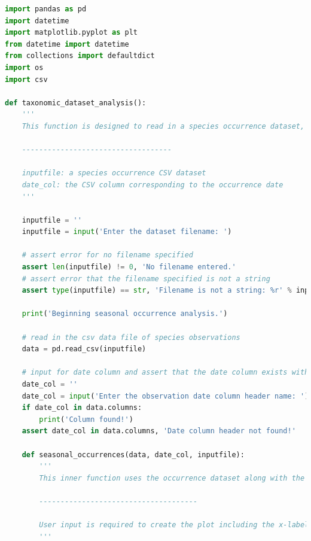 \documentclass[letterpaper]{article}
\begin{document}
\newpage
\begin{lstlisting}[language=Python]
import pandas as pd
import datetime
import matplotlib.pyplot as plt
from datetime import datetime
from collections import defaultdict
import os
import csv

def taxonomic_dataset_analysis():
    '''
    This function is designed to read in a species occurrence dataset, analyze the data, and create useful outputs for understanding taxon occurrences 	throughout seasons. The function also outputs a CSV file that contains the counts of each unique taxon in the dataset in respect to the taxonomic rank specified by the user.
    
    -----------------------------------
    
    inputfile: a species occurrence CSV dataset
    date_col: the CSV column corresponding to the occurrence date
    '''
    
    inputfile = ''
    inputfile = input('Enter the dataset filename: ')
    
    # assert error for no filename specified
    assert len(inputfile) != 0, 'No filename entered.'
    # assert error that the filename specified is not a string
    assert type(inputfile) == str, 'Filename is not a string: %r' % inputfile

    print('Beginning seasonal occurrence analysis.')
    
    # read in the csv data file of species observations
    data = pd.read_csv(inputfile)
    
    # input for date column and assert that the date column exists within dataset
    date_col = ''
    date_col = input('Enter the observation date column header name: ')
    if date_col in data.columns:
        print('Column found!')
    assert date_col in data.columns, 'Date column header not found!'
        
    def seasonal_occurrences(data, date_col, inputfile):
        '''
        This inner function uses the occurrence dataset along with the date column specified to  create a histogram displaying specified taxonomic rank occurrences by season. The use of this is to visualize the seasonal distribution of species or to understand when people upload species observations to online databases such as iNaturalist.
        
        -------------------------------------
        
        User input is required to create the plot including the x-label, the y-label, and the title.
        '''


\end{lstlisting}
\end{document}
